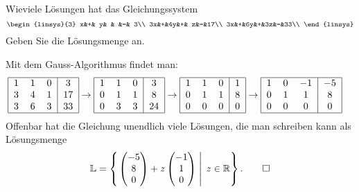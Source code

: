 Wieviele Lösungen hat das Gleichungssystem
\[
\begin{linsys}{3}
 x&+& y& &  &=& 3\\
3x&+&4y&+& z&=&17\\
3x&+&6y&+&3z&=&33\\
\end{linsys}
\]
Geben Sie die Lösungsmenge an.

\begin{loesung}
Mit dem Gauss-Algorithmus findet man:
\begin{align*}
\begin{tabular}{|ccc|c|}
\hline
1&1&0& 3\\
3&4&1&17\\
3&6&3&33\\
\hline
\end{tabular}
&\rightarrow
\begin{tabular}{|ccc|c|}
\hline
1&1&0& 3\\
0&1&1& 8\\
0&3&3&24\\
\hline
\end{tabular}
\rightarrow
\begin{tabular}{|ccc|c|}
\hline
1&1&0&1\\
0&1&1&8\\
0&0&0&0\\
\hline
\end{tabular}
\rightarrow
\begin{tabular}{|ccc|c|}
\hline
1&0&$-1$&$-5$\\
0&1&1&8\\
0&0&0&0\\
\hline
\end{tabular}
\end{align*}
Offenbar hat die Gleichung unendlich viele Lösungen,
die man schreiben kann als
Lösungsmenge
\[
\mathbb L=
\left\{
\left.
\begin{pmatrix}-5\\8\\0\end{pmatrix}+z\begin{pmatrix}-1\\1\\0\end{pmatrix}\;\right|\;z\in\mathbb R
\right\}.
\qedhere
\]
\end{loesung}

